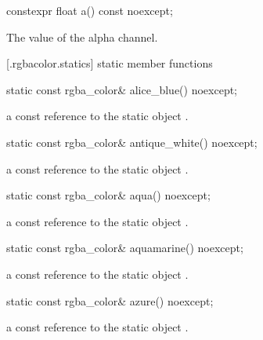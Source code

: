 \begin{itemdecl}
constexpr float a() const noexcept;
\end{itemdecl}
\begin{itemdescr}
\pnum
\returns
The value of the alpha channel.
\end{itemdescr}

 [\iotwod.rgbacolor.statics] { static member functions}

\begin{itemdecl}
static const rgba_color& alice_blue() noexcept;
\end{itemdecl}
\begin{itemdescr}
\pnum
\returns
a const reference to the static  object .
\end{itemdescr}

\begin{itemdecl}
static const rgba_color& antique_white() noexcept;
\end{itemdecl}
\begin{itemdescr}
\pnum
\returns
a const reference to the static  object .
\end{itemdescr}

\begin{itemdecl}
static const rgba_color& aqua() noexcept;
\end{itemdecl}
\begin{itemdescr}
\pnum
\returns
a const reference to the static  object .
\end{itemdescr}

\begin{itemdecl}
static const rgba_color& aquamarine() noexcept;
\end{itemdecl}
\begin{itemdescr}
\pnum
\returns
a const reference to the static  object .
\end{itemdescr}

\begin{itemdecl}
static const rgba_color& azure() noexcept;
\end{itemdecl}
\begin{itemdescr}
\pnum
\returns
a const reference to the static  object .
\end{itemdescr}

